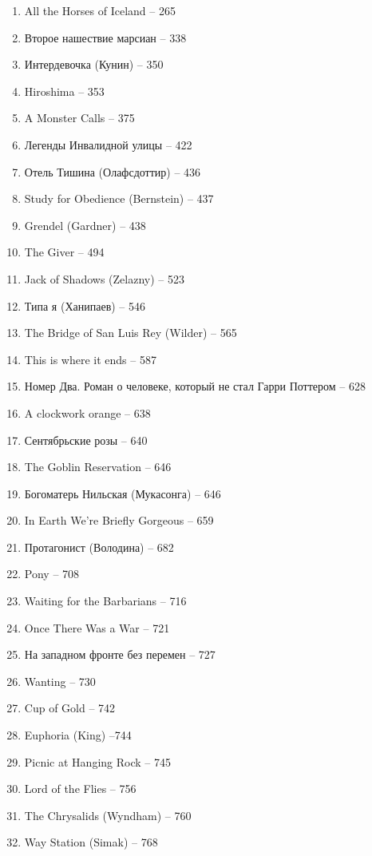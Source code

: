 \documentclass[a4paper, 11pt]{proc} %
\begin{document}
\begin{enumerate}
    \item All the Horses of Iceland -- 265
    \item Второе нашествие марсиан -- 338
    \item Интердевочка (Кунин) -- 350
    \item Hiroshima -- 353
    \item A Monster Calls -- 375
    \item Легенды Инвалидной улицы -- 422
    \item Отель Тишина (Олафсдоттир) -- 436
    \item Study for Obedience (Bernstein) -- 437
    \item Grendel (Gardner) -- 438
    \item The Giver -- 494
    \item Jack of Shadows (Zelazny) -- 523
    \item Типа я (Ханипаев) -- 546
    \item The Bridge of San Luis Rey (Wilder) -- 565
    \item This is where it ends -- 587
    \item Номер Два. Роман о человеке, который не стал Гарри Поттером -- 628
    \item A clockwork orange -- 638
    \item Сентябрьские розы -- 640
    \item The Goblin Reservation -- 646
    \item Богоматерь Нильская (Мукасонга) -- 646
    \item In Earth We're Briefly Gorgeous -- 659
    \item Протагонист (Володина) -- 682
    \item Pony -- 708
    \item Waiting for the Barbarians -- 716
    \item Once There Was a War -- 721
    \item На западном фронте без перемен -- 727
    \item Wanting -- 730
    \item Cup of Gold -- 742
    \item Euphoria (King) --744
    \item Picnic at Hanging Rock -- 745
    \item Lord of the Flies -- 756
    \item The Chrysalids (Wyndham) -- 760
    \item Way Station (Simak) -- 768

\end{enumerate}
\end{document}
